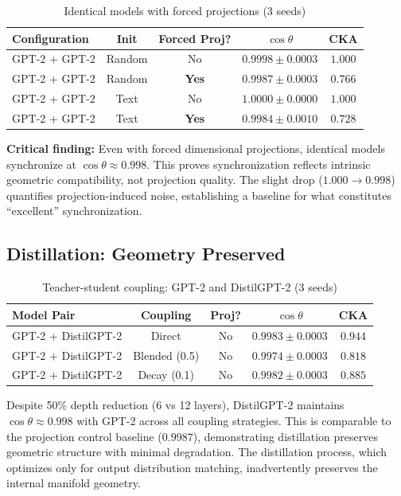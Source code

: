 \documentclass[10pt]{article} %
\theoremstyle{plain}
\theoremstyle{definition}
\theoremstyle{remark}
\begin{document}
\begin{table}[htbp]
\centering
\caption{Identical models with forced projections (3 seeds)}
\label{tab:projection_control}
\small
\begin{tabular}{lcccc}
\toprule
\textbf{Configuration} & \textbf{Init} & \textbf{Forced Proj?} & \textbf{$\cos \theta$} & \textbf{CKA} \\
\midrule
GPT-2 + GPT-2 & Random & No & $0.9998 \pm 0.0003$ & $1.000$ \\
GPT-2 + GPT-2 & Random & \textbf{Yes} & $\mathbf{0.9987 \pm 0.0003}$ & $0.766$ \\
\midrule
GPT-2 + GPT-2 & Text & No & $1.0000 \pm 0.0000$ & $1.000$ \\
GPT-2 + GPT-2 & Text & \textbf{Yes} & $\mathbf{0.9984 \pm 0.0010}$ & $0.728$ \\
\bottomrule
\end{tabular}
\end{table}

\textbf{Critical finding:} Even with forced dimensional projections, identical models synchronize at $\cos \theta \approx 0.998$. This proves synchronization reflects intrinsic geometric compatibility, not projection quality. The slight drop ($1.000 \to 0.998$) quantifies projection-induced noise, establishing a baseline for what constitutes ``excellent'' synchronization.

\subsection{Distillation: Geometry Preserved}

\begin{table}[htbp]
\centering
\caption{Teacher-student coupling: GPT-2 and DistilGPT-2 (3 seeds)}
\label{tab:distill}
\small
\begin{tabular}{lcccc}
\toprule
\textbf{Model Pair} & \textbf{Coupling} & \textbf{Proj?} & \textbf{$\cos \theta$} & \textbf{CKA} \\
\midrule
GPT-2 + DistilGPT-2 & Direct & No & $\mathbf{0.9983 \pm 0.0003}$ & $0.944$ \\
GPT-2 + DistilGPT-2 & Blended (0.5) & No & $\mathbf{0.9974 \pm 0.0003}$ & $0.818$ \\
GPT-2 + DistilGPT-2 & Decay (0.1) & No & $\mathbf{0.9982 \pm 0.0003}$ & $0.885$ \\
\bottomrule
\end{tabular}
\end{table}

Despite 50\% depth reduction (6 vs 12 layers), DistilGPT-2 maintains $\cos \theta \approx 0.998$ with GPT-2 across all coupling strategies. This is comparable to the projection control baseline ($0.9987$), demonstrating distillation preserves geometric structure with minimal degradation. The distillation process, which optimizes only for output distribution matching, inadvertently preserves the internal manifold geometry.
\end{document}
